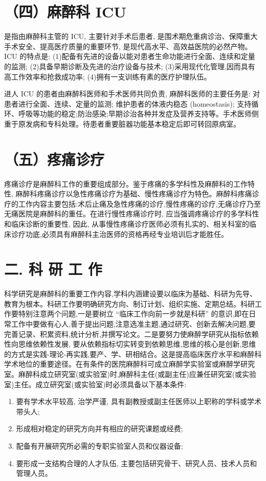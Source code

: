 \documentclass[10pt]{article}
\begin{document}
\section*{（四）麻醉科 ICU}
是指由麻醉科主管的 ICU, 主要针对手术后患者, 是围术期危重病诊治、保障重大手术安全、提高医疗质量的重要环节, 是现代高水平、高效益医院的必然产物。ICU 的特点是: (1)配备有先进的设备以能对患者生命功能进行全面、连续和定量的监测; (2)具备早期诊断及先进的治疗设备与技术; (3)采用现代化管理,因而具有高工作效率和抢救成功率; (4)拥有一支训练有素的医疗护理队伍。

进人 ICU 的患者由麻醉科医师和手术医师共同负责, 麻醉科医师的主要任务是: 对患者进行全面、连续、定量的监测; 维护患者的体液内稳态 (homeostasis); 支持循环、呼吸等功能的稳定;防治感染;早期诊治各种并发症及营养支持等。手术医师侧重于原发病和专科处理。待患者重要脏器功能基本稳定后即可转回原病室。

\section*{（五）疼痛诊疗}
疼痛诊疗是麻醉科工作的重要组成部分。鉴于疼痛的多学科性及麻醉科的工作特性, 麻醉科疼痛诊疗以急性疼痛诊疗为基础、慢性疼痛诊疗为特色。麻醉科疼痛诊疗的工作内容主要包括:术后止痛及急性疼痛的诊疗,慢性疼痛的诊疗,无痛诊疗乃至无痛医院是麻醉科的重任。在进行慢性疼痛诊疗时, 应当强调疼痛诊疗的多学科性和临床诊断的重要性, 因此, 从事慢性疼痛诊疗医师必须有扎实的、相关科室的临床诊疗功底,必须具有麻醉科主治医师的资格再经专业培训后才能胜任。

\section*{二. 科 研 工 作}
科学研究是麻醉科的重要工作内容,学科内涵建设要以临床为基础、科研为先导、教育为根本。科研工作要明确研究方向、制订计划、组织实施、定期总结。科研工作要特别注意两个问题,一是要树立 “临床工作向前一步就是科研” 的意识,即在日常工作中要做有心人,善于提出问题,注意选准主题,通过研究、创新去解决问题,要完善记录、积累资料,统计分析,并撰写论文。二是要努力使麻醉学研究从指标依赖性向思维依赖性发展, 要从依赖指标切实转变到依赖思维,思维的核心是创新,思维的方式是实践-理论-再实践,要产、学、研相结合。这是提高临床医疗水平和麻醉科学术地位的重要途径。在有条件的医院麻醉科可成立麻醉学实验室或麻醉学研究室。麻醉科成立研究室(或实验室)时,麻醉科主任(或副主任)应兼任研究室(或实验室)主任。成立研究室(或实验室)时必须具备以下基本条件:

\begin{enumerate}
  \item 要有学术水平较高, 治学严谨, 具有副教授或副主任医师以上职称的学科或学术带头人;

  \item 形成相对稳定的研究方向并有相应的研究课题或经费;

  \item 配备有开展研究所必需的专职实验室人员和仪器设备;

  \item 要形成一支结构合理的人才队伍, 主要包括研究骨干、研究人员、技术人员和管理人员。

\end{enumerate}
\end{document}

